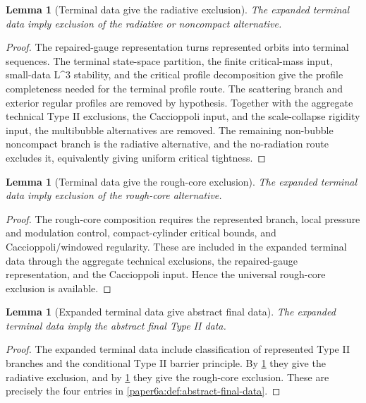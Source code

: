\documentclass[11pt]{amsart}
\def\({}%
\def\){}%
\theoremstyle{plain}
\newtheorem{lemma}[theorem]{Lemma}
\theoremstyle{definition}
\theoremstyle{remark}
\begin{document}
\begin{lemma}[Terminal data give the radiative exclusion]
\label{paper6a:lem:terminal-radiative}
The expanded terminal data imply exclusion of the radiative or noncompact
alternative.
\end{lemma}

\begin{proof}
The repaired-gauge representation turns represented orbits into terminal
sequences.  The terminal state-space partition, the finite critical-mass input,
small-data \(L^3\) stability, and the critical profile decomposition give the
profile completeness needed for the terminal profile route.  The scattering
branch and exterior regular profiles are removed by hypothesis.  Together with
the aggregate technical Type II exclusions, the Caccioppoli input, and the
scale-collapse rigidity input, the multibubble alternatives are removed.  The
remaining non-bubble noncompact branch is the radiative alternative,
and the no-radiation route excludes it, equivalently giving uniform critical
tightness.
\end{proof}

\begin{lemma}[Terminal data give the rough-core exclusion]
\label{paper6a:lem:terminal-roughcore}
The expanded terminal data imply exclusion of the rough-core alternative.
\end{lemma}

\begin{proof}
The rough-core composition requires the represented branch, local pressure and
modulation control, compact-cylinder critical bounds, and Caccioppoli/windowed
regularity.  These are included in the expanded terminal data through the
aggregate technical exclusions, the repaired-gauge representation, and the
Caccioppoli input.  Hence the universal rough-core exclusion is available.
\end{proof}

\begin{lemma}[Expanded terminal data give abstract final data]
\label{paper6a:lem:expanded-to-abstract}
The expanded terminal data imply the abstract final Type II data.
\end{lemma}

\begin{proof}
The expanded terminal data include classification of represented Type II
branches and the conditional Type II barrier principle.  By
\cref{paper6a:lem:terminal-radiative} they give the radiative exclusion, and by
\cref{paper6a:lem:terminal-roughcore} they give the rough-core exclusion.
These are precisely the four entries in
\cref{paper6a:def:abstract-final-data}.
\end{proof}
\end{document}
